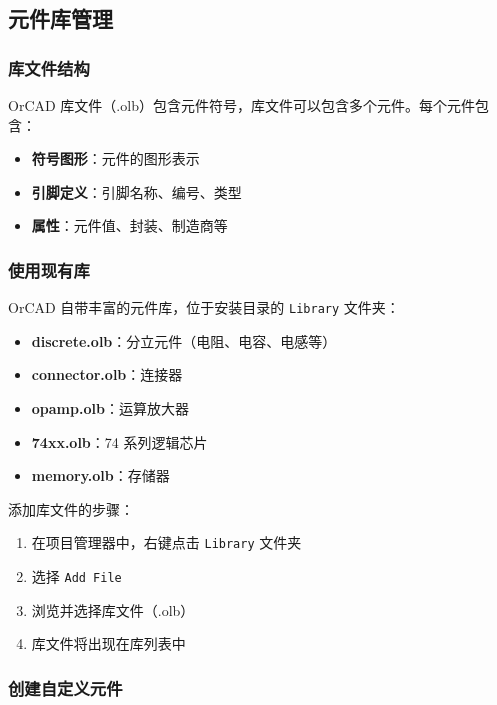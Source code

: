 \subsection{元件库管理}

\subsubsection{库文件结构}

OrCAD 库文件（.olb）包含元件符号，库文件可以包含多个元件。每个元件包含：

\begin{itemize}
  \item \textbf{符号图形}：元件的图形表示
  \item \textbf{引脚定义}：引脚名称、编号、类型
  \item \textbf{属性}：元件值、封装、制造商等
\end{itemize}

\subsubsection{使用现有库}

OrCAD 自带丰富的元件库，位于安装目录的 \lstinline{Library} 文件夹：

\begin{itemize}
  \item \textbf{discrete.olb}：分立元件（电阻、电容、电感等）
  \item \textbf{connector.olb}：连接器
  \item \textbf{opamp.olb}：运算放大器
  \item \textbf{74xx.olb}：74 系列逻辑芯片
  \item \textbf{memory.olb}：存储器
\end{itemize}


添加库文件的步骤：

\begin{enumerate}
  \item 在项目管理器中，右键点击 \lstinline{Library} 文件夹
  \item 选择 \lstinline{Add File}
  \item 浏览并选择库文件（.olb）
  \item 库文件将出现在库列表中
\end{enumerate}

\subsubsection{创建自定义元件}

